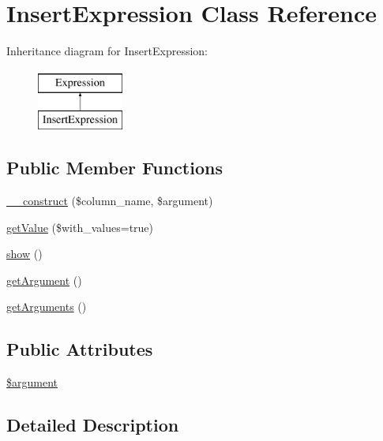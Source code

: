\hypertarget{classInsertExpression}{\section{Insert\-Expression Class Reference}
\label{classInsertExpression}
}
Inheritance diagram for Insert\-Expression\-:\begin{figure}[H]
\begin{center}
\leavevmode
\includegraphics[height=2.000000cm]{classInsertExpression}
\end{center}
\end{figure}
\subsection*{Public Member Functions}
\begin{DoxyCompactItemize}
\item 
\hyperlink{classInsertExpression_aa04adb0099a1f68e7a6edb77b32c0b12}{\-\_\-\-\_\-construct} (\$column\-\_\-name, \$argument)
\item 
\hyperlink{classInsertExpression_ad9d21fa7983a8d93730c6d16b24a0c32}{get\-Value} (\$with\-\_\-values=true)
\item 
\hyperlink{classInsertExpression_a31b4e3976aeb6d73a8f8dba3cd055c29}{show} ()
\item 
\hyperlink{classInsertExpression_aa0f93cc5194b4605d63f96b53f3d037d}{get\-Argument} ()
\item 
\hyperlink{classInsertExpression_aa18be08ea777a25c8f06505d8710ced2}{get\-Arguments} ()
\end{DoxyCompactItemize}
\subsection*{Public Attributes}
\begin{DoxyCompactItemize}
\item 
\hyperlink{classInsertExpression_a0a8efa361a069392a3cca64a675023e0}{\$argument}
\end{DoxyCompactItemize}


\subsection{Detailed Description}


